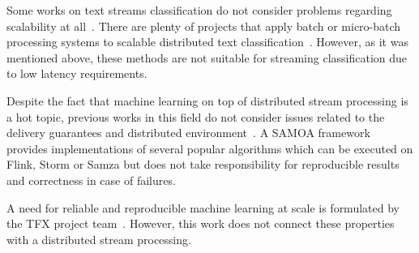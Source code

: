 \label{fs-related}

Some works on text streams classification do not consider problems regarding scalability at all~\cite{zhang2008one}. There are plenty of projects that apply batch or micro-batch processing systems to scalable distributed text classification~\cite{semberecki2016distributed, 8029336, Nodarakis2016LargeSS, baltas2016apache, svyatkovskiy2016large, berral2015aloja}. However, as it was mentioned above, these methods are not suitable for streaming classification due to low latency requirements. 

Despite the fact that machine learning on top of distributed stream processing is a hot topic, previous works in this field do not consider issues related to the delivery guarantees and distributed environment~\cite{khumoyun2016real}. A SAMOA framework~\cite{morales2015samoa} provides implementations of several popular algorithms which can be executed on Flink, Storm or Samza but does not take responsibility for reproducible results and correctness in case of failures.

A need for reliable and reproducible machine learning at scale is formulated by the TFX project team~\cite{Baylor:2017:TTP:3097983.3098021}. However, this work does not connect these properties with a distributed stream processing. 